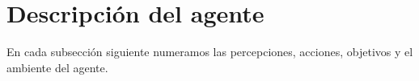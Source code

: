 \section{Descripción del agente}

En cada subsección siguiente numeramos las percepciones, acciones, objetivos
y el ambiente del agente.






